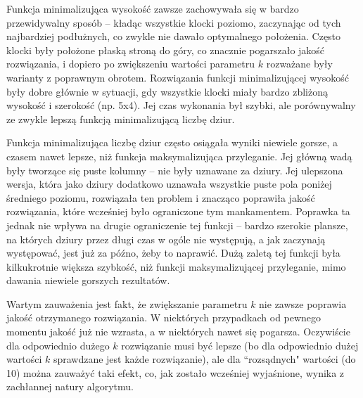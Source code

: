 \documentclass{article}
\begin{document}
Funkcja minimalizująca wysokość zawsze zachowywała się w bardzo przewidywalny sposób -- kładąc wszystkie klocki poziomo, zaczynając od tych najbardziej podłużnych, co zwykle nie dawało optymalnego położenia. Często klocki były położone płaską stroną do góry, co znacznie pogarszało jakość rozwiązania, i dopiero po zwiększeniu wartości parametru $k$ rozważane były warianty z poprawnym obrotem. Rozwiązania funkcji minimalizującej wysokość były dobre głównie w sytuacji, gdy wszystkie klocki miały bardzo zbliżoną wysokość i szerokość (np. 5x4). Jej czas wykonania był szybki, ale porównywalny ze zwykle lepszą funkcją minimalizującą liczbę dziur.

Funkcja minimalizująca liczbę dziur często osiągała wyniki niewiele gorsze, a czasem nawet lepsze, niż funkcja maksymalizująca przyleganie. Jej główną wadą były tworzące się puste kolumny -- nie były uznawane za dziury. Jej ulepszona wersja, która jako dziury dodatkowo uznawała wszystkie puste pola poniżej średniego poziomu, rozwiązała ten problem i znacząco poprawiła jakość rozwiązania, które wcześniej było ograniczone tym mankamentem. Poprawka ta jednak nie wpływa na drugie ograniczenie tej funkcji -- bardzo szerokie plansze, na których dziury przez długi czas w ogóle nie występują, a jak zaczynają występować, jest już za późno, żeby to naprawić. Dużą zaletą tej funkcji była kilkukrotnie większa szybkość, niż funkcji maksymalizującej przyleganie, mimo dawania niewiele gorszych rezultatów.

Wartym zauważenia jest fakt, że zwiększanie parametru $k$ nie zawsze poprawia jakość otrzymanego rozwiązania. W niektórych przypadkach od pewnego momentu jakość już nie wzrasta, a w niektórych nawet się pogarsza. Oczywiście dla odpowiednio dużego $k$ rozwiązanie musi być lepsze (bo dla odpowiednio dużej wartości $k$ sprawdzane jest każde rozwiązanie), ale dla ``rozsądnych" wartości (do 10) można zauważyć taki efekt, co, jak zostało wcześniej wyjaśnione, wynika z zachłannej natury algorytmu.
\end{document}
